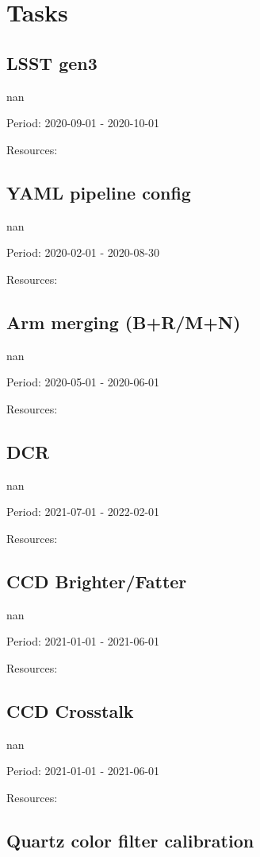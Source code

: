 \section{Tasks}\subsection{LSST gen3}

nan

Period: 2020-09-01 - 2020-10-01

Resources: 

\subsection{YAML pipeline config}

nan

Period: 2020-02-01 - 2020-08-30

Resources: 

\subsection{Arm merging (B+R/M+N)}

nan

Period: 2020-05-01 - 2020-06-01

Resources: 

\subsection{DCR}

nan

Period: 2021-07-01 - 2022-02-01

Resources: 

\subsection{CCD Brighter/Fatter}

nan

Period: 2021-01-01 - 2021-06-01

Resources: 

\subsection{CCD Crosstalk}

nan

Period: 2021-01-01 - 2021-06-01

Resources: 

\subsection{Quartz color filter calibration}

